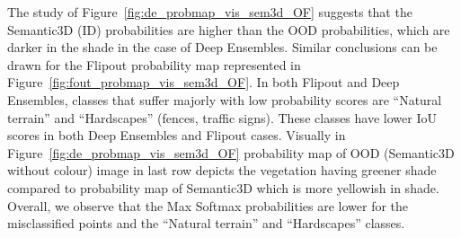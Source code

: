     The study of Figure~\ref{fig:de_probmap_vis_sem3d_OF} suggests that the Semantic3D (ID) probabilities are higher than the OOD probabilities, which are darker in the shade in the case of Deep Ensembles.
    Similar conclusions can be drawn for the Flipout probability map represented in Figure~\ref{fig:fout_probmap_vis_sem3d_OF}.
    In both Flipout and Deep Ensembles, classes that suffer majorly with low probability scores are ``Natural terrain'' and ``Hardscapes'' (fences, traffic signs). These classes have lower IoU scores in both Deep Ensembles and Flipout cases.
    Visually in Figure~\ref{fig:de_probmap_vis_sem3d_OF} probability map of OOD (Semantic3D without colour) image in last row depicts the vegetation having greener shade compared to probability map of Semantic3D which is more yellowish in shade.
    Overall, we observe that the Max Softmax probabilities are lower for the misclassified points and the ``Natural terrain'' and ``Hardscapes'' classes.
